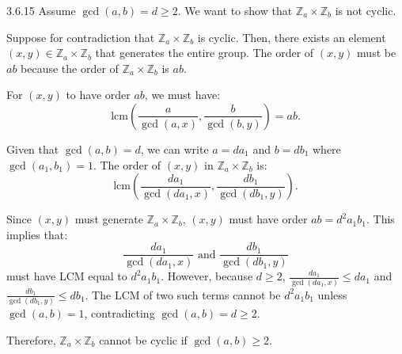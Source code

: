 \documentclass[12pt]{amsart}
\theoremstyle{definition}
\numberwithin{equation}{section}
\newcommand{\Z}{\mathbb{Z}}
\begin{document}
\begin{exercise}{3.6.15}
    Assume \(\gcd(a, b) = d \geq 2\). We want to show that \(\Z_a \times \Z_b\) is not cyclic.

    Suppose for contradiction that \(\Z_a \times \Z_b\) is cyclic. Then, there exists an element \((x, y) \in \Z_a \times \Z_b\) that generates the entire group. The order of \((x, y)\) must be \(ab\) because the order of \(\Z_a \times \Z_b\) is \(ab\).

    For \((x, y)\) to have order \(ab\), we must have:
    \[
    \text{lcm}\left(\frac{a}{\gcd(a,x)}, \frac{b}{\gcd(b,y)}\right) = ab.
    \]

    Given that \(\gcd(a,b) = d\), we can write \(a = da_1\) and \(b = db_1\) where \(\gcd(a_1,b_1) = 1\). The order of \((x, y)\) in \(\Z_a \times \Z_b\) is:
    \[
    \text{lcm}\left(\frac{da_1}{\gcd(da_1,x)}, \frac{db_1}{\gcd(db_1,y)}\right).
    \]

    Since \((x, y)\) must generate \(\Z_a \times \Z_b\), \((x, y)\) must have order \(ab = d^2a_1b_1\). This implies that:
    \[
    \frac{da_1}{\gcd(da_1,x)} \text{ and } \frac{db_1}{\gcd(db_1,y)}
    \]
    must have LCM equal to \(d^2a_1b_1\). However, because \(d \geq 2\), \(\frac{da_1}{\gcd(da_1,x)} \leq da_1\) and \(\frac{db_1}{\gcd(db_1,y)} \leq db_1\). The LCM of two such terms cannot be \(d^2a_1b_1\) unless \(\gcd(a,b) = 1\), contradicting \(\gcd(a,b) = d \geq 2\).

    Therefore, \(\Z_a \times \Z_b\) cannot be cyclic if \(\gcd(a,b) \geq 2\).

\end{exercise}
\newpage
\end{document}
